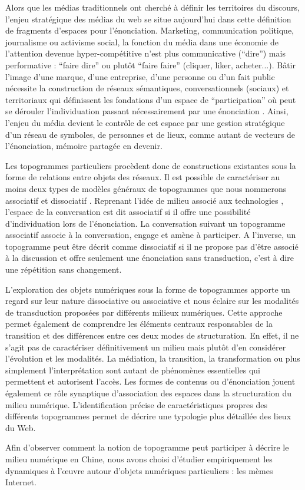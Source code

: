 Alors que les médias traditionnels ont cherché à définir les territoires du discours, l’enjeu stratégique des médias du web se situe aujourd’hui dans cette définition de fragments d’espaces pour l’énonciation. Marketing, communication politique, journalisme ou activisme social, la fonction du média dans une économie de l’attention devenue hyper-compétitive \citep{Weng2012} n’est plus communicative (``dire'') mais performative : ``faire dire'' ou plutôt ``faire faire'' (cliquer, liker, acheter...). Bâtir l’image d’une marque, d’une entreprise, d’une personne ou d’un fait public nécessite la construction de réseaux sémantiques, conversationnels (sociaux) et territoriaux qui définissent les fondations d’un espace de ``participation'' où peut se dérouler l’individuation passant nécessairement par une énonciation \citep{Butler1993}. Ainsi, l’enjeu du média devient le contrôle de cet espace par une gestion stratégique d’un réseau de symboles, de personnes et de lieux, comme autant de vecteurs de l’énonciation, mémoire partagée en devenir. 

Les topogrammes particuliers procèdent donc de constructions existantes sous la forme de relations entre objets des réseaux. Il est possible de caractériser au moins deux types de modèles généraux de topogrammes que nous nommerons associatif et dissociatif \citep{Stiegler2008}. Reprenant l’idée de milieu associé aux technologies \citep{Simondon1989}, l’espace de la conversation est dit associatif si il offre une possibilité d’individuation lors de l’énonciation. La conversation suivant un topogramme associatif associe à la conversation, engage et amène à participer. A l’inverse, un topogramme peut être décrit comme dissociatif si il ne propose pas d’être associé à la discussion et offre seulement une énonciation sans transduction, c’est à dire une répétition sans changement.

L’exploration des objets numériques sous la forme de topogrammes apporte un regard sur leur nature dissociative ou associative et nous éclaire sur les modalités de transduction proposées par différents milieux numériques. Cette approche permet également de comprendre les éléments centraux responsables de la transition et des différences entre ces deux modes de structuration. En effet, il ne s’agit pas de caractériser définitivement un milieu mais plutôt d’en considérer l’évolution et les modalités. La médiation, la transition, la transformation ou plus simplement l’interprétation sont autant de phénomènes essentielles qui permettent et autorisent l’accès. Les formes de contenus ou d’énonciation jouent également ce rôle synaptique d’association des espaces dans la structuration du milieu numérique. L’identification précise de caractéristiques propres des différents topogrammes permet de décrire une typologie plus détaillée des lieux du Web. 

Afin d’observer comment la notion de topogramme peut participer à décrire le milieu numérique en Chine, nous avons choisi d’étudier empiriquement les dynamiques à l’œuvre autour d'objets numériques particuliers : les mèmes Internet. 
